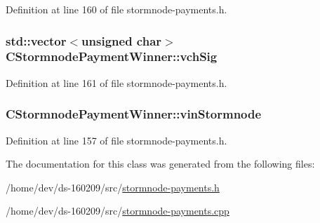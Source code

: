 Definition at line 160 of file stormnode-\/payments.\+h.

\hypertarget{class_c_stormnode_payment_winner_a2a689114ee80f528238760a5ae3bdcb9}{}
\subsubsection[{vch\+Sig}]{\setlength{\rightskip}{0pt plus 5cm}std\+::vector$<$unsigned char$>$ C\+Stormnode\+Payment\+Winner\+::vch\+Sig}\label{class_c_stormnode_payment_winner_a2a689114ee80f528238760a5ae3bdcb9}


Definition at line 161 of file stormnode-\/payments.\+h.

\hypertarget{class_c_stormnode_payment_winner_a6514e77cb8997131c47e39b3118606fa}{}
\subsubsection[{vin\+Stormnode}]{ C\+Stormnode\+Payment\+Winner\+::vin\+Stormnode}\label{class_c_stormnode_payment_winner_a6514e77cb8997131c47e39b3118606fa}


Definition at line 157 of file stormnode-\/payments.\+h.



The documentation for this class was generated from the following files\+:\begin{DoxyCompactItemize}
\item 
/home/dev/ds-\/160209/src/\hyperlink{stormnode-payments_8h}{stormnode-\/payments.\+h}\item 
/home/dev/ds-\/160209/src/\hyperlink{stormnode-payments_8cpp}{stormnode-\/payments.\+cpp}\end{DoxyCompactItemize}
